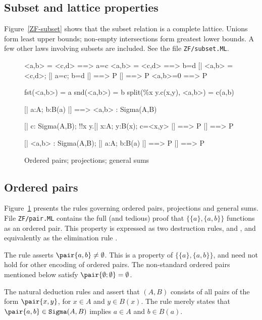 \subsection{Subset and lattice properties}
Figure~\ref{ZF-subset} shows that the subset relation is a complete
lattice.  Unions form least upper bounds; non-empty intersections form
greatest lower bounds.  A few other laws involving subsets are included.
See the file {\tt ZF/subset.ML}.


\begin{figure}
\begin{ttbox}
    <a,b> = <c,d> ==> a=c
    <a,b> = <c,d> ==> b=d
     [| <a,b> = <c,d>;  [| a=c; b=d |] ==> P |] ==> P
      <a,b>=0 ==> P

       fst(<a,b>) = a
       snd(<a,b>) = b
     split(\%x y.c(x,y), <a,b>) = c(a,b)

    [| a:A;  b:B(a) |] ==> <a,b> : Sigma(A,B)

    [| c: Sigma(A,B);  
             !!x y.[| x:A; y:B(x); c=<x,y> |] ==> P |] ==> P

   [| <a,b> : Sigma(A,B);    
             [| a:A;  b:B(a) |] ==> P   |] ==> P
\end{ttbox}
\caption{Ordered pairs; projections; general sums} \label{ZF-pair}
\end{figure}


\subsection{Ordered pairs}
Figure~\ref{ZF-pair} presents the rules governing ordered pairs,
projections and general sums.  File {\tt ZF/pair.ML} contains the
full (and tedious) proof that $\{\{a\},\{a,b\}\}$ functions as an ordered
pair.  This property is expressed as two destruction rules,
 and , and equivalently
as the elimination rule .

The rule  asserts $\pair{a,b}\neq\emptyset$.  This
is a property of $\{\{a\},\{a,b\}\}$, and need not hold for other 
encoding of ordered pairs.  The non-standard ordered pairs mentioned below
satisfy $\pair{\emptyset;\emptyset}=\emptyset$.

The natural deduction rules  and 
assert that $(A,B)$ consists of all pairs of the form
$\pair{x,y}$, for $x\in A$ and $y\in B(x)$.  The rule 
merely states that $\pair{a,b}\in {\tt Sigma}(A,B)$ implies $a\in A$ and
$b\in B(a)$.


